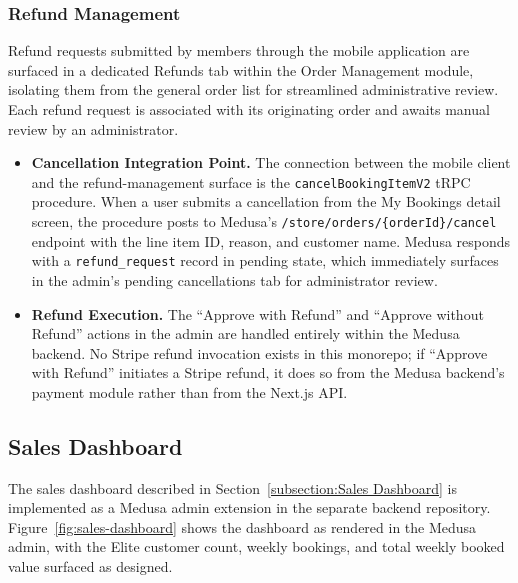 \subsubsection{Refund Management}
\label{subsubsection:Refund Management}
Refund requests submitted by members through the mobile application are surfaced in a dedicated Refunds tab within the Order Management module, isolating them from the general order list for streamlined administrative review. Each refund request is associated with its originating order and awaits manual review by an administrator.

\begin{itemize}
  \item \textbf{Cancellation Integration Point.} The connection between the mobile client and the refund-management surface is the \texttt{cancelBookingItemV2} tRPC procedure. When a user submits a cancellation from the My Bookings detail screen, the procedure posts to Medusa's \texttt{/store/orders/\{orderId\}/cancel} endpoint with the line item ID, reason, and customer name. Medusa responds with a \texttt{refund\_request} record in pending state, which immediately surfaces in the admin's pending cancellations tab for administrator review.
  \item \textbf{Refund Execution.} The ``Approve with Refund'' and ``Approve without Refund'' actions in the admin are handled entirely within the Medusa backend. No Stripe refund invocation exists in this monorepo; if ``Approve with Refund'' initiates a Stripe refund, it does so from the Medusa backend's payment module rather than from the Next.js API.
\end{itemize}

\subsection{Sales Dashboard}
The sales dashboard described in Section~\ref{subsection:Sales Dashboard} is implemented as a Medusa admin extension in the separate backend repository. Figure~\ref{fig:sales-dashboard} shows the dashboard as rendered in the Medusa admin, with the Elite customer count, weekly bookings, and total weekly booked value surfaced as designed.


